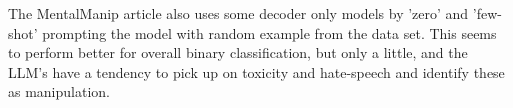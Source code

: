 \documentclass[
	letterpaper, %
	12pt, %
	unnumberedsections, %
	twoside, %
]{LTJournalArticle}
\begin{document}
The MentalManip article \cite{MentalManip} also uses some decoder only models by 'zero' and 'few-shot' prompting the model with random example from the data set. This seems to perform better for overall binary classification, but only a little, and the LLM's have a tendency to pick up on toxicity and hate-speech and identify these as manipulation.


\clearpage
\onecolumn
\printbibliography %

\appendix
{}
\end{document}
